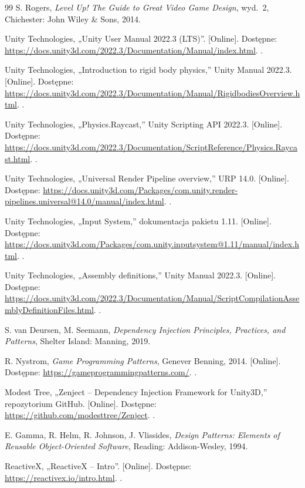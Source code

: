 \begin{thebibliography}{99}
 S. Rogers, \emph{Level Up! The Guide to Great Video Game Design},
  wyd.~2, Chichester: John Wiley \& Sons, 2014.

 Unity Technologies, „Unity User Manual 2022.3 (LTS)”. [Online].
  Dostępne: \url{https://docs.unity3d.com/2022.3/Documentation/Manual/index.html}. \dostep.

 Unity Technologies, „Introduction to rigid body physics,” Unity
  Manual 2022.3. [Online]. Dostępne:
  \url{https://docs.unity3d.com/2022.3/Documentation/Manual/RigidbodiesOverview.html}.
  \dostep.

 Unity Technologies, „Physics.Raycast,” Unity Scripting API
  2022.3. [Online]. Dostępne:
  \url{https://docs.unity3d.com/2022.3/Documentation/ScriptReference/Physics.Raycast.html}.
  \dostep.

 Unity Technologies, „Universal Render Pipeline overview,” URP 14.0.
  [Online]. Dostępne:
  \url{https://docs.unity3d.com/Packages/com.unity.render-pipelines.universal@14.0/manual/index.html}.
  \dostep.

 Unity Technologies, „Input System,” dokumentacja pakietu 1.11.
  [Online]. Dostępne:
  \url{https://docs.unity3d.com/Packages/com.unity.inputsystem@1.11/manual/index.html}.
  \dostep.

 Unity Technologies, „Assembly definitions,” Unity Manual 2022.3.
  [Online]. Dostępne:
  \url{https://docs.unity3d.com/2022.3/Documentation/Manual/ScriptCompilationAssemblyDefinitionFiles.html}.
  \dostep.

 S. van Deursen, M. Seemann, \emph{Dependency Injection Principles,
  Practices, and Patterns}, Shelter Island: Manning, 2019.

 R. Nystrom, \emph{Game Programming Patterns}, Genever Benning, 2014.
  [Online]. Dostępne: \url{https://gameprogrammingpatterns.com/}. \dostep.

 Modest Tree, „Zenject -- Dependency Injection Framework for Unity3D,”
  repozytorium GitHub. [Online]. Dostępne: \url{https://github.com/modesttree/Zenject}.
  \dostep.

 E. Gamma, R. Helm, R. Johnson, J. Vlissides, \emph{Design Patterns: Elements
  of Reusable Object-Oriented Software}, Reading: Addison-Wesley, 1994.

 ReactiveX, „ReactiveX -- Intro”. [Online]. Dostępne:
  \url{https://reactivex.io/intro.html}. \dostep.


\end{thebibliography}
